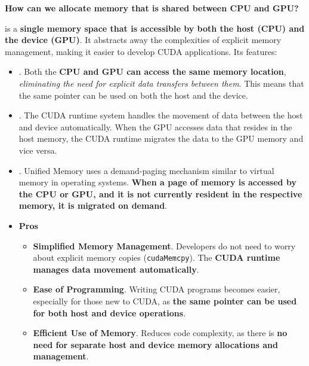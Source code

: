 \begin{flushleft}
    \textcolor{Green3}{ \textbf{How can we allocate memory that is shared between CPU and GPU?}}
\end{flushleft}
 is a \textbf{single memory space that is accessible by both the host (CPU) and the device (GPU)}. It abstracts away the complexities of explicit memory management, making it easier to develop CUDA applications. Its features:
\begin{itemize}
    \item {}. Both the \textbf{CPU and GPU can access the same memory location}, \emph{eliminating the need for explicit data transfers between them}. This means that the same pointer can be used on both the host and the device.

    \item {}. The CUDA runtime system handles the movement of data between the host and device automatically. When the GPU accesses data that resides in the host memory, the CUDA runtime migrates the data to the GPU memory and vice versa.

    \item {}. Unified Memory uses a demand-\break paging mechanism similar to virtual memory in operating systems. \textbf{When a page of memory is accessed by the CPU or GPU, and it is not currently resident in the respective memory, it is migrated on demand}.

    \item[\textcolor{Green3}{\faIcon{check}}] \textcolor{Green3}{\textbf{Pros}}
    \begin{itemize}
        \item[\textcolor{Green3}{\faIcon{check}}] \textcolor{Green3}{\textbf{Simplified Memory Management}}. Developers do not need to worry about explicit memory copies (\texttt{cudaMemcpy}). The \textbf{CUDA runtime manages data movement automatically}.
        
        \item[\textcolor{Green3}{\faIcon{check}}] \textcolor{Green3}{\textbf{Ease of Programming}}. Writing CUDA programs becomes easier, especially for those new to CUDA, as \textbf{the same pointer can be used for both host and device operations}.
        
        \item[\textcolor{Green3}{\faIcon{check}}] \textcolor{Green3}{\textbf{Efficient Use of Memory}}. Reduces code complexity, as there is \textbf{no need for separate host and device memory allocations and management}.
    \end{itemize}


\end{itemize}
